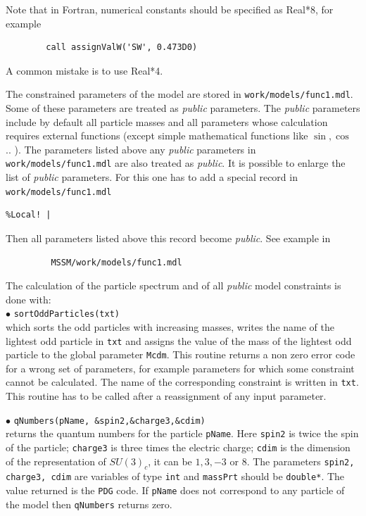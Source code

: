 \documentclass[12pt,a4paper]{article}
\begin{document}
Note that in  Fortran, numerical constants should be specified as  Real*8, for example
\begin{verbatim}     
        call assignValW('SW', 0.473D0) 
\end{verbatim}
A common mistake is to use Real*4.  


The constrained parameters of the model are stored in \verb|work/models/func1.mdl|. Some of
these parameters are treated as {\it public} parameters. The {\it public} parameters include 
by default all particle masses 
and all parameters  whose calculation requires external functions (except simple
mathematical functions like $\sin,\cos$ .. ). The parameters
listed above any {\it public} parameters in  \verb|work/models/func1.mdl|
are also treated as {\it public}. 
It is possible to enlarge the list of {\it public} parameters. For this
one has to add a  special record in \verb|work/models/func1.mdl|
\begin{verbatim}
%Local! |   
\end{verbatim}
Then all parameters listed above this record  become {\it public}. 
See example in
\begin{verbatim} 
         MSSM/work/models/func1.mdl 
\end{verbatim}

The calculation of the particle spectrum and of all  {\it public} model constraints 
is  done with:\\
\noindent
 $\bullet$ \verb|sortOddParticles(txt)|\\
which sorts the odd
particles with increasing  masses,  writes the name of the lightest odd particle 
in \verb|txt| and    assigns  the value of the mass  of
the lightest odd particle to the global parameter \verb|Mcdm|.
This routine returns a non zero error code for a
wrong set of parameters, for example parameters  for which some
constraint cannot be calculated.
The name of the corresponding constraint is
written in \verb|txt|. This routine has to be called after a reassignment of any input parameter.

\noindent 
$\bullet$ \verb|qNumbers(pName, &spin2,&charge3,&cdim)|\\
returns the quantum numbers for the particle \verb|pName|. Here \verb|spin2| is twice the spin of the particle; \verb|charge3| is 
three times the electric charge; \verb|cdim| is the  dimension of the representation
of $SU(3)_c$, it can be $1,3,-3$ or $8$. The parameters {\tt spin2, charge3, cdim} are 
variables of type {\tt int} and {\tt massPrt} should be {\tt double*}. The value returned 
is the {\tt PDG} code. If \verb|pName| does not correspond to any
particle of the model then \verb|qNumbers| returns zero.
\end{document}
